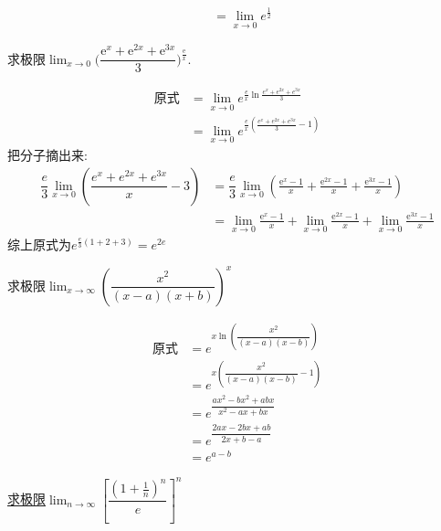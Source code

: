 \documentclass[8pt a4paper, oneside, UTF8]{ctexbook}
\begin{document}
\begin{sloppypar}
\begin{solution}
\begin{align*}
                & = \lim_{x\to 0}e^{\frac{1}{2}}
            \end{align*}
        \end{solution}
         \begin{problem}
            求极限$\lim_{x\to0}\Bigg(\dfrac{\mathrm{e}^x+\mathrm{e}^{2x}+\mathrm{e}^{3x}}3\Bigg)^{\frac{\mathrm{e}}{x}}.$
        \end{problem}
        \begin{solution}
            \begin{align*}
              \text{原式} & = \lim_{x\to0} e^{\frac{e}{x} \ln \frac{e^x+e^{2x}+e^{3x}}{3}}\\
              & = \lim_{x\to0} e^{\frac{e}{x}(\frac{e^x+e^{2x}+e^{3x}}{3}-1)}
            \end{align*}
        把分子摘出来:
        \begin{align*}
          \dfrac{e}{3} \lim_{x\to 0}(\dfrac{e^x+e^{2x}+e^{3x}}{x} -3) & =\dfrac{e}{3} \lim_{x\to 0} (\frac{\mathrm{e}^x-1}x+\frac{\mathrm{e}^{2x}-1}x+\frac{\mathrm{e}^{3x}-1}x)\\
          & = \lim_{x\to0}\frac{\mathrm{e}^{x}-1}{x}+\lim_{x\to0}\frac{\mathrm{e}^{2x}-1}{x}+\lim_{x\to0}\frac{\mathrm{e}^{3x}-1}{x}
        \end{align*}
        综上原式为$e^{\frac{e}{3}(1+2+3)}=e^{2e}$
        \end{solution}
        \begin{problem}
            求极限$\lim_{x\to\infty}\left(\dfrac{x^2}{(x-a)(x+b)}\right)^x$
        \end{problem}
        \begin{solution}
            \begin{align*}
              \text{原式} & =e^{x \ln \left(\dfrac{x^2}{(x-a)(x-b)}\right)}\\
              & =e^{x \left(\dfrac{x^2}{(x-a)(x-b)}-1\right)}\\
              & = e^{\dfrac{ax^2-bx^2+abx}{x^2-ax+bx}}\\
              & = e^{\dfrac{2ax-2bx+ab}{2x+b-a}}\\
              & = e^{a-b}
            \end{align*}
        \end{solution} 
        \begin{problem}
           \uline{求极限}$\lim_{n\to\infty}\left[\dfrac{\left(1+\frac1n\right)^n}e\right]^n$        
        \end{problem}
        \begin{solution}

\end{solution}
\end{sloppypar}
\end{document}
